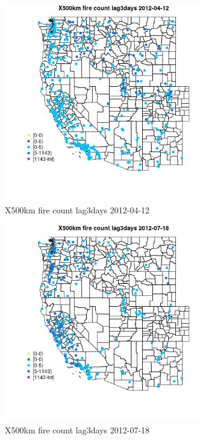 \begin{figure} 
\centering  
\includegraphics[width=0.77\textwidth]{Code_Outputs/Report_ML_input_PM25_Step4_part_e_de_duplicated_aves_compiled_2019-05-14wNAs_MapObsX500km_fire_count_lag3days2012-04-12.jpg} 
\caption{\label{fig:Report_ML_input_PM25_Step4_part_e_de_duplicated_aves_compiled_2019-05-14wNAsMapObsX500km_fire_count_lag3days2012-04-12}X500km fire count lag3days 2012-04-12} 
\end{figure} 
 

\begin{figure} 
\centering  
\includegraphics[width=0.77\textwidth]{Code_Outputs/Report_ML_input_PM25_Step4_part_e_de_duplicated_aves_compiled_2019-05-14wNAs_MapObsX500km_fire_count_lag3days2012-07-18.jpg} 
\caption{\label{fig:Report_ML_input_PM25_Step4_part_e_de_duplicated_aves_compiled_2019-05-14wNAsMapObsX500km_fire_count_lag3days2012-07-18}X500km fire count lag3days 2012-07-18} 
\end{figure} 
 


